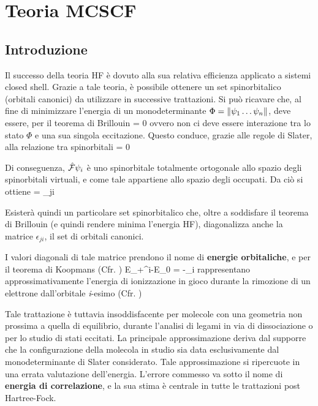\section{Teoria MCSCF}
\subsection{Introduzione}

Il successo della teoria HF \`e dovuto alla sua relativa efficienza
applicato a sistemi closed shell. Grazie a tale teoria, \`e possibile
ottenere un set spinorbitalico (orbitali canonici) da
utilizzare in successive trattazioni.
Si pu\`o ricavare che, al fine di minimizzare l'energia di un 
monodeterminante $\Phi = \left\Vert \psi_1 \ldots \psi_n \right\Vert $, deve essere, per il
teorema di Brillouin
\beq
{} = 0 
\eeq
ovvero non ci deve essere interazione tra lo stato $\Phi$ e una sua
singola eccitazione. Questo conduce, grazie alle regole di Slater,
alla relazione tra spinorbitali
\beq
\braket{\psia}{\fock}{\psii} = 0
\eeq

Di conseguenza, $\hat{\mathcal{F}}\psi_i$ \`e uno spinorbitale totalmente
ortogonale allo spazio degli spinorbitali virtuali, e come tale
appartiene allo spazio degli occupati. Da ci\`o si ottiene
\beq
\fock\psii = \psij\epsilon_{ji}
\eeq

Esister\`a quindi un particolare set spinorbitalico che, oltre a
soddisfare il teorema di Brillouin (e quindi rendere minima l'energia
HF), diagonalizza anche la matrice $\epsilon_{ji}$, il set di orbitali
canonici. 

I valori diagonali di tale matrice prendono il nome di \textbf{energie
orbitaliche}, e per il teorema di Koopmans (Cfr. \cite{tp-1-1933-104})
\beq
E_+^i-E_0 = -\epsilon_i
\eeq
rappresentano approssimativamente l'energia di ionizzazione in gioco
durante la rimozione di un elettrone dall'orbitale \textit{i}-esimo (Cfr.
\cite{jce-75-11-1998-1494})

Tale trattazione \`e tuttavia insoddisfacente per molecole con una geometria
non prossima a quella di equilibrio, durante l'analisi di
legami in via di dissociazione o per lo studio di stati eccitati. 
La principale approssimazione deriva dal supporre che la configurazione
della molecola in studio sia data esclusivamente dal monodeterminante di
Slater considerato. Tale approssimazione si ripercuote in una errata
valutazione dell'energia. L'errore commesso va sotto il nome di
\textbf{energia di correlazione}, e la sua stima \`e centrale in tutte le
trattazioni post Hartree-Fock.


